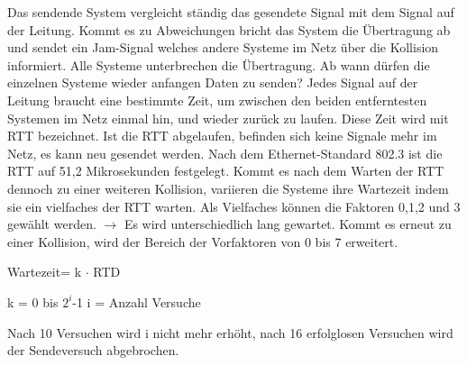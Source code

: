 \documentclass[12pt,a4paper]{article}
\begin{document}
    Das sendende System vergleicht ständig das gesendete Signal mit dem Signal auf der Leitung. Kommt es zu Abweichungen bricht das System die Übertragung ab und sendet ein Jam-Signal welches andere Systeme im Netz über die Kollision informiert. Alle Systeme unterbrechen die Übertragung.\newline
    Ab wann dürfen die einzelnen Systeme wieder anfangen Daten zu senden?\newline\newline
    Jedes Signal auf der Leitung braucht eine bestimmte Zeit, um zwischen den beiden entferntesten Systemen im Netz einmal hin, und wieder zurück zu laufen. Diese Zeit wird mit RTT bezeichnet. Ist die RTT abgelaufen, befinden sich keine Signale mehr im Netz, es kann neu gesendet werden. \newline\newline
    Nach dem Ethernet-Standard 802.3 ist die RTT auf 51,2 Mikrosekunden festgelegt.\newline\newline
    Kommt es nach dem Warten der RTT dennoch zu einer weiteren Kollision, variieren die Systeme ihre Wartezeit indem sie ein vielfaches der RTT warten. Als Vielfaches können die Faktoren 0,1,2 und 3 gewählt werden.\newline
    $\longrightarrow$ Es wird unterschiedlich lang gewartet. \newline\newline
    Kommt es erneut zu einer Kollision, wird der Bereich der Vorfaktoren von 0 bis 7 erweitert.
    \begin{center}
        Wartezeit= k $\cdot$ RTD
    \end{center}
    \begin{center}
        k = 0 bis $2^{i}$-1 \hspace{2cm} i = Anzahl Versuche
    \end{center}
    Nach 10 Versuchen wird i nicht mehr erhöht, nach 16 erfolglosen Versuchen wird der Sendeversuch abgebrochen.

    
\end{document}
